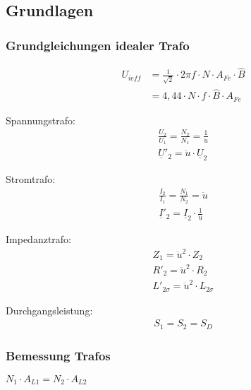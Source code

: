 \documentclass[a4paper,11pt]{article}
\begin{document}
	\subsection{Grundlagen}
	\subsubsection{Grundgleichungen idealer Trafo}

    \vspace{-1em}
    \begin{align*}
        U_{ieff} &= \frac{1}{\sqrt{2}} \cdot 2 \pi f \cdot N \cdot A_{Fe} \cdot
        \hat{B}\\ &= 4,44 \cdot N \cdot f \cdot \hat{B} \cdot A_{Fe}
    \end{align*}

    Spannungstrafo:
    \begin{gather*}
        \frac{U_{2}}{U_{1}} = \frac{N_{2}}{N_{1}} = \frac{1}{\ddot{u}} \\
        \underline{U}'_{2}  = \ddot{u} \cdot \underline{U}_{2}
    \end{gather*}

    Stromtrafo:
    \begin{gather*}
        \frac{I_{2}}{I_{1}} = \frac{N_{1}}{N_{2}} = \ddot{u}\\
        \underline{I}'_{2} = \underline{I}_{2} \cdot \frac{1}{\ddot{u}}
    \end{gather*}

    Impedanztrafo:
    \begin{gather*}
        Z_{1} = \ddot{u}^2 \cdot Z_{2}\\
        R'_{2} = \ddot{u}^2 \cdot R_{2}\\
        L'_{2\sigma} = \ddot{u}^2 \cdot L_{2\sigma}
    \end{gather*}



    Durchgangsleistung:
    \begin{gather*}
        S_{1} = S_{2} = S_{D}
    \end{gather*}

	\subsubsection{Bemessung Trafos}

	$N_{1} \cdot A_{L1} = N_{2} \cdot A_{L2}$
\end{document}
